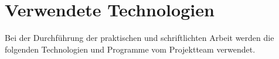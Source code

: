 \section{Verwendete Technologien}
Bei der Durchführung der praktischen und schriftlichten Arbeit werden die folgenden Technologien und Programme vom Projektteam verwendet.\\

\clearpage






\clearpage



\clearpage

